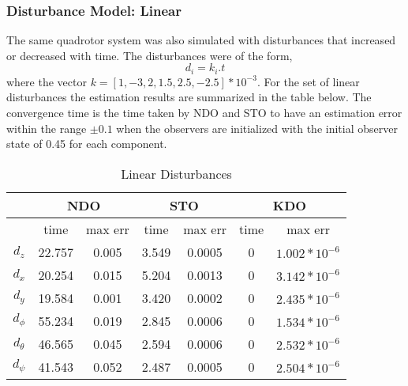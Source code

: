 \documentclass{article}
\begin{document}
\subsubsection{Disturbance Model: Linear}
The same quadrotor system was also simulated with disturbances that increased or decreased with time. The disturbances were of the form, 
\begin{equation}
d_i = k_i.t
\label{eq:dist_3}
\end{equation}
where the vector $k=[1,-3,2,1.5,2.5,-2.5]*10^{-3}$. 
For the set of linear disturbances the estimation results are summarized in the table below. The convergence time is the time taken by NDO and STO to have an estimation error within the range $\pm0.1$ when the observers are initialized with the initial observer state of 0.45 for each component. 
\begin{table}[!htbp]
\centering
\caption{Linear Disturbances}
\begin{tabular}{*7c}
\toprule
{} &  \multicolumn{2}{c}{NDO} & \multicolumn{2}{c}{STO} & \multicolumn{2}{c}{KDO}\\
\midrule
{}        &   time   & max err  & time  & max err& time  & max err\\
$d_z$     &  22.757 & 0.005   & 3.549  & 0.0005 & 0     & $1.002*10^{-6}$\\
$d_x$     &  20.254 & 0.015   & 5.204  & 0.0013 & 0     & $3.142*10^{-6}$\\
$d_y$     &  19.584 & 0.001   & 3.420  & 0.0002 & 0     & $2.435*10^{-6}$\\
$d_\phi$  &  55.234 & 0.019   & 2.845  & 0.0006 & 0     & $1.534*10^{-6}$\\
$d_\theta$&  46.565 & 0.045   & 2.594  & 0.0006 & 0     & $2.532*10^{-6}$\\
$d_\psi$  &  41.543 & 0.052   & 2.487  & 0.0005 & 0     & $2.504*10^{-6}$\\
\bottomrule
\end{tabular}
\end{table}
\end{document}

